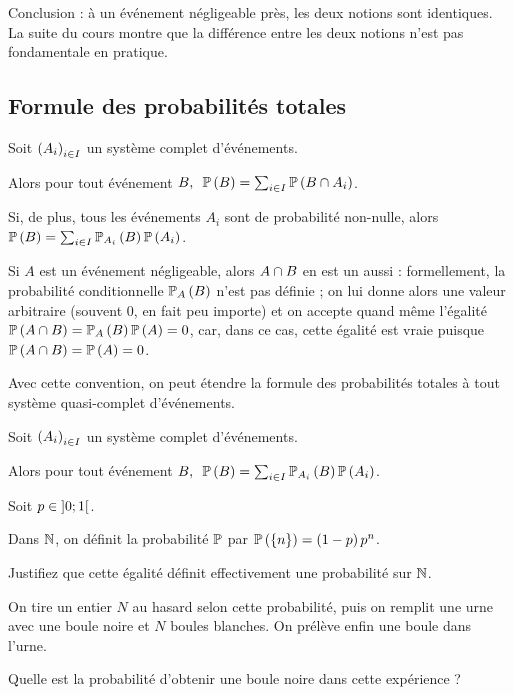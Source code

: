 Conclusion : à un événement négligeable près, les deux notions sont identiques. La suite du cours montre que la différence entre les deux notions n'est pas fondamentale en pratique.

\subsection{Formule des probabilités totales}

\begin{theo}
Soit \(\paren{A_i}_{i\in I}\) un système complet d'événements.

Alors pour tout événement \(\quantifs{B}\proba{B}=\sum_{i\in I}\proba{B\inter A_i}\).

Si, de plus, tous les événements \(A_i\) sont de probabilité non-nulle, alors \(\proba{B}=\sum_{i\in I}\probacond{B}{A_i}\proba{A_i}\).
\end{theo}

Si \(A\) est un événement négligeable, alors \(A\inter B\) en est un aussi : formellement, la probabilité conditionnelle \(\probacond{B}{A}\) n'est pas définie ; on lui donne alors une valeur arbitraire (souvent \(0\), en fait peu importe) et on accepte quand même l'égalité \(\proba{A\inter B}=\probacond{B}{A}\proba{A}=0\), car, dans ce cas, cette égalité est vraie puisque \(\proba{A\inter B}=\proba{A}=0\).

Avec cette convention, on peut étendre la formule des probabilités totales à tout système quasi-complet d'événements.

\begin{theo}
Soit \(\paren{A_i}_{i\in I}\) un système complet d'événements.

Alors pour tout événement \(\quantifs{B}\proba{B}=\sum_{i\in I}\probacond{B}{A_i}\proba{A_i}\).
\end{theo}

\begin{exo}
Soit \(p\in\intervee{0}{1}\).

Dans \(\N\), on définit la probabilité \(\prem\) par \(\proba{\accol{n}}=\paren{1-p}p^n\).

Justifiez que cette égalité définit effectivement une probabilité sur \(\N\).

On tire un entier \(N\) au hasard selon cette probabilité, puis on remplit une urne avec une boule noire et \(N\) boules blanches. On prélève enfin une boule dans l'urne.

Quelle est la probabilité d'obtenir une boule noire dans cette expérience ?
\end{exo}

